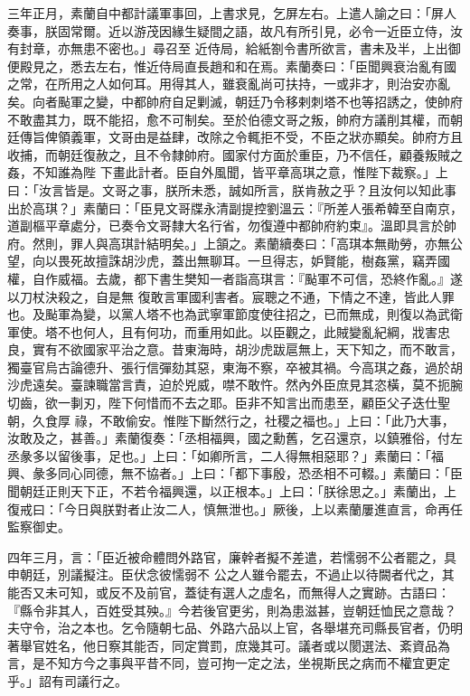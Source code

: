 \begin{pinyinscope}
 三年正月，素蘭自中都計議軍事回，上書求見，乞屏左右。上遣人諭之曰：「屏人奏事，朕固常爾。近以游茂因緣生疑間之語，故凡有所引見，必令一近臣立侍，汝有封章，亦無患不密也。」尋召至
 近侍局，給紙劄令書所欲言，書未及半，上出御便殿見之，悉去左右，惟近侍局直長趙和和在焉。素蘭奏曰：「臣聞興衰治亂有國之常，在所用之人如何耳。用得其人，雖衰亂尚可扶持，一或非才，則治安亦亂矣。向者颭軍之變，中都帥府自足剿滅，朝廷乃令移剌刺塔不也等招誘之，使帥府不敢盡其力，既不能招，愈不可制矣。至於伯德文哥之叛，帥府方議削其權，而朝廷傳旨俾領義軍，文哥由是益肆，改除之令輒拒不受，不臣之狀亦顯矣。帥府方且收捕，而朝廷復赦之，且不令隸帥府。國家付方面於重臣，乃不信任，顧養叛賊之姦，不知誰為陛
 下畫此計者。臣自外風聞，皆平章高琪之意，惟陛下裁察。」上曰：「汝言皆是。文哥之事，朕所未悉，誠如所言，朕肯赦之乎？且汝何以知此事出於高琪？」素蘭曰：「臣見文哥牒永清副提控劉溫云：『所差人張希韓至自南京，道副樞平章處分，已奏令文哥隸大名行省，勿復遵中都帥府約束』。溫即具言於帥府。然則，罪人與高琪計結明矣。」上頷之。素蘭續奏曰：「高琪本無勛勞，亦無公望，向以畏死故擅誅胡沙虎，蓋出無聊耳。一旦得志，妒賢能，樹姦黨，竊弄國權，自作威福。去歲，都下書生樊知一者詣高琪言：『颭軍不可信，恐終作亂。』遂以刀杖決殺之，自是無
 復敢言軍國利害者。宸聰之不通，下情之不達，皆此人罪也。及颭軍為變，以黨人塔不也為武寧軍節度使往招之，已而無成，則復以為武衛軍使。塔不也何人，且有何功，而重用如此。以臣觀之，此賊變亂紀綱，戕害忠良，實有不欲國家平治之意。昔東海時，胡沙虎跋扈無上，天下知之，而不敢言，獨臺官烏古論德升、張行信彈劾其惡，東海不察，卒被其禍。今高琪之姦，過於胡沙虎遠矣。臺諫職當言責，迫於兇威，噤不敢忤。然內外臣庶見其恣橫，莫不扼腕切齒，欲一剚刃，陛下何惜而不去之耶。臣非不知言出而患至，顧臣父子迭仕聖朝，久食厚
 祿，不敢偷安。惟陛下斷然行之，社稷之福也。」上曰：「此乃大事，汝敢及之，甚善。」素蘭復奏：「丞相福興，國之勳舊，乞召還京，以鎮雅俗，付左丞彖多以留後事，足也。」上曰：「如卿所言，二人得無相惡耶？」素蘭曰：「福興、彖多同心同德，無不協者。」上曰：「都下事殷，恐丞相不可輟。」素蘭曰：「臣聞朝廷正則天下正，不若令福興還，以正根本。」上曰：「朕徐思之。」素蘭出，上復戒曰：「今日與朕對者止汝二人，慎無泄也。」厥後，上以素蘭屢進直言，命再任監察御史。



 四年三月，言：「臣近被命體問外路官，廉幹者擬不差遣，若懦弱不公者罷之，具申朝廷，別議擬注。臣伏念彼懦弱不
 公之人雖令罷去，不過止以待闕者代之，其能否又未可知，或反不及前官，蓋徒有選人之虛名，而無得人之實跡。古語曰：『縣令非其人，百姓受其殃。』今若後官更劣，則為患滋甚，豈朝廷恤民之意哉？夫守令，治之本也。乞令隨朝七品、外路六品以上官，各舉堪充司縣長官者，仍明著舉官姓名，他日察其能否，同定賞罰，庶幾其可。議者或以閡選法、紊資品為言，是不知方今之事與平昔不同，豈可拘一定之法，坐視斯民之病而不權宜更定乎。」詔有司議行之。




\end{pinyinscope}
